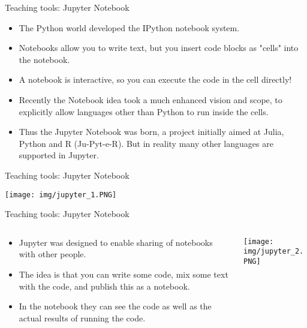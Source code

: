 \documentclass[11pt]{beamer}
\begin{document}
%
%
\begin{frame}{Teaching tools: Jupyter Notebook}
\begin{itemize}
\item The Python world developed the IPython notebook system. 
\item Notebooks  allow you to write text, but you insert code blocks as "cells" into the notebook. 
\item A notebook is interactive, so you can execute the code in the cell directly!
\item Recently the Notebook idea took a much enhanced vision and scope, to explicitly allow languages other than Python to run inside the cells. 
\item Thus the Jupyter Notebook was born, a project initially aimed at Julia, Python and R (Ju-Pyt-e-R). But in reality many other languages are supported in Jupyter.
\end{itemize}
\end{frame}
\begin{frame}{Teaching tools: Jupyter Notebook}
\begin{center}
\texttt{[image: img/jupyter\_1.PNG]} 
\end{center}
\end{frame}
\begin{frame}{Teaching tools: Jupyter Notebook}
\begin{columns}[T] %
\begin{column}{.48\textwidth}
		\begin{itemize}
			\item Jupyter was designed to enable sharing of notebooks with other people. 
			\item The idea is that you can write some code, mix some text with the code, and publish this as a notebook.  
\item In the notebook they can see the code as well as the actual results of running the code.
		\end{itemize}
\end{column}%
\hfill%
\begin{column}{.48\textwidth}
		\texttt{[image: img/jupyter\_2.PNG]}
\end{column}%
\end{columns}
\end{frame}
\end{document}
